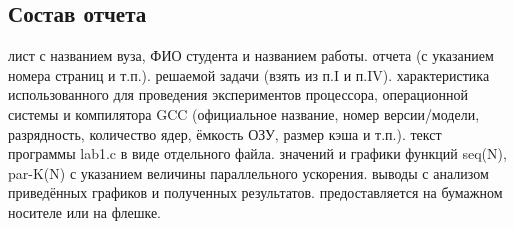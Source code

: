 { %
	\subsection{Состав отчета}
	\begin{enumerate}
		 лист с названием вуза, ФИО студента и названием работы.
		 отчета (с указанием номера страниц и т.п.).
		 решаемой задачи (взять из п.I и п.IV).
		 характеристика использованного для проведения экспериментов процессора, операционной системы и компилятора GCC (официальное название, номер версии/модели, разрядность, количество ядер, ёмкость ОЗУ, размер кэша и т.п.).
		 текст программы lab1.c в виде отдельного файла.
		 значений и графики функций seq(N), par-K(N) с указанием величины параллельного ускорения.
		 выводы с анализом приведённых графиков и полученных результатов.
		 предоставляется на бумажном носителе или на флешке.
	\end{enumerate}
}